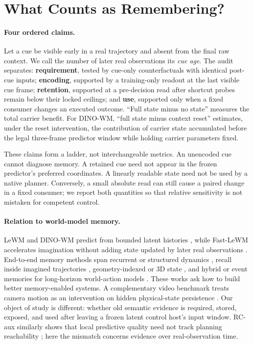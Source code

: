 \section{What Counts as Remembering?}

\paragraph{Four ordered claims.}
Let a cue be visible early in a real trajectory and absent from the final raw
context.  We call the number of later real observations its \emph{cue age}.
The audit separates:
\textbf{requirement}, tested by cue-only counterfactuals with identical
post-cue inputs;
\textbf{encoding}, supported by a training-only readout at the last visible cue
frame;
\textbf{retention}, supported at a pre-decision read after shortcut probes
remain below their locked ceilings; and
\textbf{use}, supported only when a fixed consumer changes an executed outcome.
``Full state minus no state'' measures the total carrier benefit.
For DINO-WM, ``full state minus context reset'' estimates, under the reset
intervention, the contribution of carrier state accumulated before the legal
three-frame predictor window while holding carrier parameters fixed.

These claims form a ladder, not interchangeable metrics.  An unencoded cue
cannot diagnose memory.  A retained cue need not appear in the frozen
predictor's preferred coordinates.  A linearly readable state need not be used
by a native planner.  Conversely, a small absolute read can still cause a
paired change in a fixed consumer; we report both quantities so that relative
sensitivity is not mistaken for competent control.

\paragraph{Relation to world-model memory.}
LeWM and DINO-WM predict from bounded latent histories
\citep{r_lewm,r_dinowm}, while Fast-LeWM accelerates imagination without adding
state updated by later real observations \citep{r_fastlewm}.  End-to-end memory
methods span recurrent or structured dynamics \citep{r_dreamerv3,r_r2i,r_s4wm},
recall inside imagined trajectories \citep{r_onmemory}, geometry-indexed or 3D
state \citep{r_memworld,r_persist}, and hybrid or event memories for long-horizon
world-action models \citep{r_memorywam,r_dimwam}.  These works ask how to build
better memory-enabled systems.  A complementary video benchmark treats camera
motion as an intervention on hidden physical-state persistence
\citep{r_statecore}.  Our object of study is different: whether old semantic
evidence is required, stored, exposed, and used after leaving a frozen latent
control host's input window.  RC-aux similarly shows that local predictive
quality need not track planning reachability \citep{r_rcaux}; here the mismatch
concerns evidence over real-observation time.

